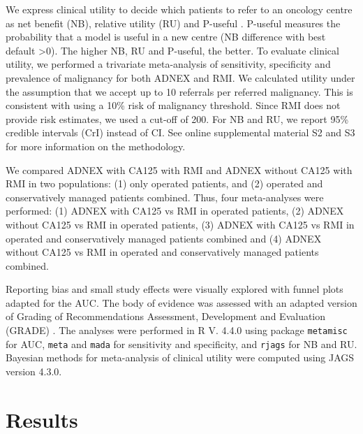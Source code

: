 We express clinical utility to decide which patients to refer to an oncology centre
as net benefit (\gls{NB}), relative utility (\gls{RU}) and P-useful
 \cite{vickersDecisionCurveAnalysis2006,vickersNetBenefitApproaches2016,wynantsRandomeffectsMetaanalysisClinical2018,bakerPuttingRiskPrediction2009,bakerUsingRelativeUtility2009}.
P-useful measures the probability that a model is useful in a new centre (\gls{NB}
difference with best default >0). The higher \gls{NB}, \gls{RU} and P-useful, the better. To
evaluate clinical utility, we performed a trivariate meta-analysis of sensitivity,
specificity and prevalence of malignancy for both \gls{ADNEX} and \gls{RMI}. We calculated
utility under the assumption that we accept up to 10 referrals per referred
malignancy. This is consistent with using a 10\% risk of malignancy threshold. Since
\gls{RMI} does not provide risk estimates, we used a cut-off of 200. For \gls{NB} and \gls{RU}, we
report 95\% credible intervals (\gls{CrI}) instead of \gls{CI}. See online supplemental material
S2 and S3 for more information on the methodology.

We compared \gls{ADNEX} with CA125 with \gls{RMI} and \gls{ADNEX} without CA125 with \gls{RMI} in two
populations: (1) only operated patients, and (2) operated and conservatively managed
patients combined. Thus, four meta-analyses were performed: (1) \gls{ADNEX} with CA125 vs
\gls{RMI} in operated patients, (2) \gls{ADNEX} without CA125 vs \gls{RMI} in operated patients, (3)
\gls{ADNEX} with CA125 vs \gls{RMI} in operated and conservatively managed patients combined and
(4) \gls{ADNEX} without CA125 vs \gls{RMI} in operated and conservatively managed patients
combined.

Reporting bias and small study effects were visually explored with funnel plots
adapted for the \gls{AUC}. The body of evidence was assessed with an adapted version of
Grading of Recommendations Assessment, Development and Evaluation (\gls{GRADE})
 \cite{guyattGRADEEmergingConsensus2008}. The analyses were performed in R V. 4.4.0
using package \texttt{metamisc} for \gls{AUC}, \texttt{meta} and \texttt{mada} for sensitivity and
specificity, and \texttt{rjags} for \gls{NB} and \gls{RU}. Bayesian methods for meta-analysis of clinical
utility were computed using \gls{JAGS} version 4.3.0.

\section{Results}

